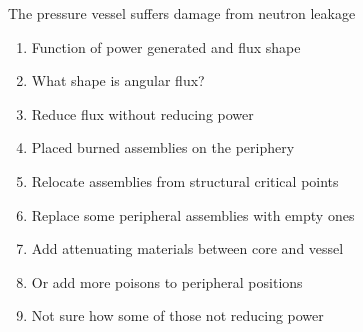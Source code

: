 \documentclass[aspectratio=1610,pdftex,dvipsnames,compress,xcolor={dvipsnames}]{beamer}
\begin{document}
\begin{frame}{The pressure vessel suffers damage from neutron leakage}
    \begin{enumerate}[series=outerlist,topsep=0pt,itemsep=7pt,leftmargin=*,label=(\arabic*)]
        \item[]Function of power generated and flux shape
        \item[]What shape is angular flux? 
        \item[]Reduce flux without reducing power
        \item[]Placed burned assemblies on the periphery
        \item[]Relocate assemblies from structural critical points
        \item[]Replace some peripheral assemblies with empty ones
        \item[]Add attenuating materials between core and vessel
        \item[]Or add more poisons to peripheral positions
        \item[]Not sure how some of those not reducing power
    \end{enumerate}
\end{frame}
\end{document}

